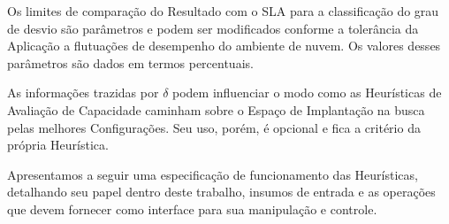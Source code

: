 Os limites de comparação do Resultado com o SLA para a classificação do grau de 
desvio são parâmetros e podem ser modificados conforme a tolerância da Aplicação
a flutuações de desempenho do ambiente de nuvem. Os valores desses parâmetros 
são dados em termos percentuais.

As informações trazidas por $\delta$ podem influenciar o modo como as Heurísticas
de Avaliação de Capacidade caminham sobre o Espaço de Implantação na busca pelas 
melhores Configurações. Seu uso, porém, é opcional e fica a critério da própria 
Heurística.

Apresentamos a seguir uma especificação de funcionamento das Heurísticas, 
detalhando seu papel dentro deste trabalho, insumos de entrada e as operações
que devem fornecer como interface para sua manipulação e controle.
